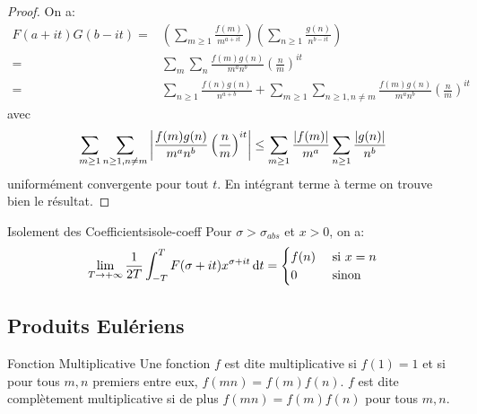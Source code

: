 \documentclass{cours}
\begin{document}
\begin{proof}
	On a: 
	\begin{equation*}
		\begin{aligned}
			F(a + it)G(b - it) =& \left(\sum_{m \geq 1}\frac{f(m)}{m^{a + it}}\right)\left(\sum_{n \geq 1}\frac{g(n)}{n^{b - it}}\right)\\
		=& \sum_{m}\sum_{n}\frac{f(m)g(n)}{m^{a}n^{b}}\left(\frac{n}{m}\right)^{it}\\
		=& \sum_{n \geq 1}\frac{f(n) g(n)}{n^{a + b}} + \sum_{m \geq 1}\sum_{n \geq 1, n \neq m} \frac{f(m)g(n)}{m^{a}n^{b}}\left(\frac{n}{m}\right)^{it}
		\end{aligned}
	\end{equation*}
	avec
	\begin{equation*}
	\sum_{m \geq 1}\sum_{n \geq 1, n \neq m} \left|\frac{f(m)g(n)}{m^{a}n^{b}}\left(\frac{n}{m}\right)^{it}\right| \leq \sum_{m \geq 1} \frac{\left|f(m)\right|}{m^{a}}\sum_{n \geq 1}\frac{\left|g(n)\right|}{n^{b}}
	\end{equation*}
	uniformément convergente pour tout $t$. En intégrant terme à terme on trouve bien le résultat. 
\end{proof}

\begin{théorème}
	{Isolement des Coefficients}{isole-coeff}
	Pour $\sigma > \sigma_{abs}$ et $x > 0$, on a:
	\begin{equation*}
		\lim_{T \to +\infty}\frac{1}{2T}\int_{- T}^{T}F(\sigma + it)x^{\sigma + it}{\rm \, d} t = \begin{cases}
			f(n) & \text{ si } x = n\\
			0 & \text{ sinon } 
		\end{cases}
	\end{equation*}
\end{théorème}

\subsection{Produits Eulériens}
\begin{définition}
	{Fonction Multiplicative}{}
	Une fonction $f$ est dite multiplicative si $f(1) = 1$ et si pour tous $m, n$ premiers entre eux, $f(mn) = f(m)f(n)$. $f$ est dite complètement multiplicative si de plus $f(mn) = f(m)f(n)$ pour tous $m, n$. 
\end{définition}
\end{document}
